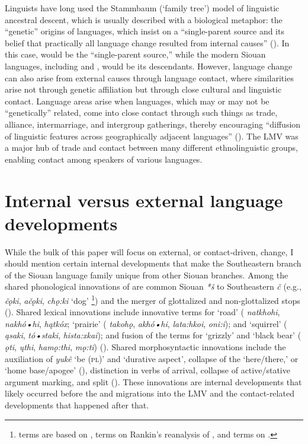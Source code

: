 \documentclass[output=paper]{LSP/langsci}
\begin{document}
Linguists have long used the Stammbaum (`family tree') model of linguistic ancestral descent, which is usually described with a biological metaphor: the “genetic” origins of languages, which insist on a “single-parent source and its belief that practically all language change resulted from internal causes” (\citealt[7]{Winford2003}). In this case,  would be the “single-parent source,” while the modern Siouan languages, including  and , would be its descendants. However, language change can also arise from external causes through language contact, where similarities arise not through genetic affiliation but through close cultural and linguistic contact. Language areas arise when languages, which may or may not be “genetically” related, come into close contact through such things as trade, alliance, intermarriage, and intergroup gatherings, thereby encouraging “diffusion of linguistic features across geographically adjacent languages” (\citealt[7]{Winford2003}). The LMV was a major hub of trade and contact between many different ethnolinguistic groups, enabling contact among speakers of various languages. 

\section{Internal versus external language developments}

While the bulk of this paper will focus on external, or contact-driven, change, I should mention certain internal developments that make the Southeastern branch of the Siouan language family unique from other Siouan branches. Among the shared phonological innovations of  are common Siouan \emph{*š} to Southeastern \emph{č} (e.g.,  \emph{čǫki},  \emph{ačǫki},  \emph{chǫ:ki} `dog' \footnote{ terms are based on \citet{DorseySwanton1912},  terms on Rankin’s reanalysis \citeyearpar{Rankin2002} of \citet{DorseySwanton1912}, and  terms on \citet{Oliverio1996}.}) and the merger of glottalized and non-glottalized stops (\citealt{Rankin2011}). Shared lexical innovations include innovative terms for `road' ( \emph{natkhohi},  \emph{nakhó•hi},  \emph{hątkóx}; `prairie' ( \emph{takohǫ},  \emph{akhó•hi},  \emph{lata:hkoi}, \emph{oni:i}); and `squirrel' ( \emph{ąsaki},  \emph{tó•staki},  \emph{hista:xkai}); and fusion of the terms for `grizzly' and `black bear' ( \emph{ǫti},  \emph{ųthi},  \emph{hamǫ:thi}, \emph{mǫ:ti}) (\citealt{Rankin2011}). Shared morphosyntactic innovations include the auxiliation of \emph{yukê} `be (\textsc{pl})' and `durative aspect', collapse of the `here/there,' or `home base/apogee' (\citealt[125]{Cumberland2005}), distinction in verbs of arrival, collapse of active/stative argument marking, and split  (\citealt{Cumberland2005}). These innovations are internal developments that likely occurred before the  and  migrations into the LMV and the contact-related developments that happened after that.
\end{document}
